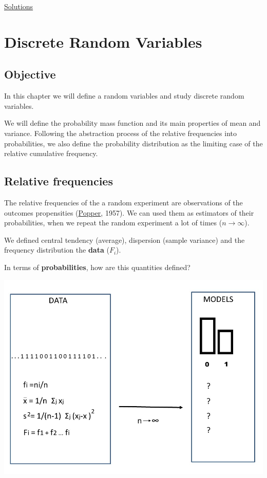 \documentclass[
]{book}
\begin{document}
\href{https://colab.research.google.com/drive/1ncTaoBgskCJcBIb0-PdnbUFr_AKU0XRF?usp=sharing}{Solutions}

\hypertarget{discrete-random-variables}{%
\chapter{Discrete Random Variables}\label{discrete-random-variables}}

\hypertarget{objective}{%
\section{Objective}\label{objective}}

In this chapter we will define a random variables and study discrete random variables.

We will define the probability mass function and its main properties of mean and variance. Following the abstraction process of the relative frequencies into probabilities, we also define the probability distribution as the limiting case of the relative cumulative frequency.

\hypertarget{relative-frequencies-2}{%
\section{Relative frequencies}\label{relative-frequencies-2}}

The relative frequencies of the a random experiment are observations of the outcomes propensities (\href{https://plato.stanford.edu/entries/probability-interpret/}{Popper}, 1957). We can used them as estimators of their probabilities, when we repeat the random experiment a lot of times (\(n \rightarrow \infty\)).

We defined central tendency (average), dispersion (sample variance) and the frequency distribution the \textbf{data} (\(F_i\)).

In terms of \textbf{probabilities}, how are this quantities defined?

\includegraphics{./figures/randomvar.JPG}
\end{document}
